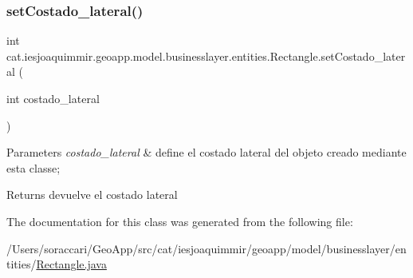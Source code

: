 \subsubsection{\texorpdfstring{set\+Costado\+\_\+lateral()}{setCostado\_lateral()}}
{\footnotesize\ttfamily int cat.\+iesjoaquimmir.\+geoapp.\+model.\+businesslayer.\+entities.\+Rectangle.\+set\+Costado\+\_\+lateral (\begin{DoxyParamCaption}\item[{int}]{costado\+\_\+lateral }\end{DoxyParamCaption})\hspace{0.3cm}{\ttfamily [inline]}}


\begin{DoxyParams}{Parameters}
{\em costado\+\_\+lateral} & define el costado lateral del objeto creado mediante esta classe; \\
\hline
\end{DoxyParams}
\begin{DoxyReturn}{Returns}
devuelve el costado lateral 
\end{DoxyReturn}


The documentation for this class was generated from the following file\+:\begin{DoxyCompactItemize}
\item 
/\+Users/soraccari/\+Geo\+App/src/cat/iesjoaquimmir/geoapp/model/businesslayer/entities/\mbox{\hyperlink{_rectangle_8java}{Rectangle.\+java}}\end{DoxyCompactItemize}
